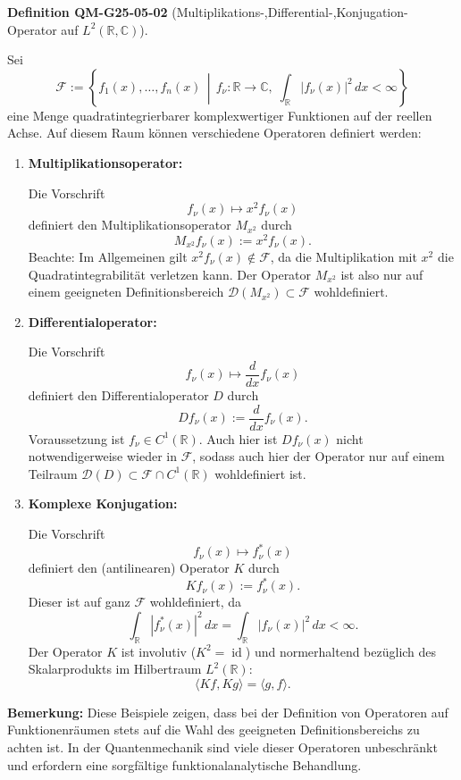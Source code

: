 \documentclass[10pt, letterpaper]{article}
\newcommand{\R}{\mathbb{R}}
\newcommand{\C}{\mathbb{C}}
\newcommand{\CustomHeading}[3]{%
  \par\medskip\noindent%
  \textbf{#1 #2} \textnormal{(#3)}.\enskip%
}
\newenvironment{DEF}[2]{\begin{unitbox}\CustomHeading{Definition}{#1}{#2}}{\end{unitbox}}
\begin{document}
\begin{DEF}{QM-G25-05-02}{Multiplikations-,Differential-,Konjugation-Operator auf $L^2(\R,\C)$}
Sei
\[
\mathcal{F} := \left\{ f_1(x), \dotsc, f_n(x) \,\middle|\, f_\nu : \mathbb{R} \to \mathbb{C}, \; \int_{\mathbb{R}} |f_\nu(x)|^2 \, dx < \infty \right\}
\]
eine Menge quadratintegrierbarer komplexwertiger Funktionen auf der reellen Achse. Auf diesem Raum können verschiedene Operatoren definiert werden:

\begin{enumerate}
  \item \textbf{Multiplikationsoperator:}

  Die Vorschrift
  \[
  f_\nu(x) \mapsto x^2 f_\nu(x)
  \]
  definiert den Multiplikationsoperator $M_{x^2}$ durch
  \[
  M_{x^2} f_\nu(x) := x^2 f_\nu(x).
  \]
  Beachte: Im Allgemeinen gilt $x^2 f_\nu(x) \notin \mathcal{F}$, da die Multiplikation mit $x^2$ die Quadratintegrabilität verletzen kann. Der Operator $M_{x^2}$ ist also nur auf einem geeigneten Definitionsbereich $\mathcal{D}(M_{x^2}) \subset \mathcal{F}$ wohldefiniert.

  \item \textbf{Differentialoperator:}

  Die Vorschrift
  \[
  f_\nu(x) \mapsto \frac{d}{dx} f_\nu(x)
  \]
  definiert den Differentialoperator $D$ durch
  \[
  D f_\nu(x) := \frac{d}{dx} f_\nu(x).
  \]
  Voraussetzung ist $f_\nu \in C^1(\mathbb{R})$. Auch hier ist $D f_\nu(x)$ nicht notwendigerweise wieder in $\mathcal{F}$, sodass auch hier der Operator nur auf einem Teilraum $\mathcal{D}(D) \subset \mathcal{F} \cap C^1(\mathbb{R})$ wohldefiniert ist.

  \item \textbf{Komplexe Konjugation:}

  Die Vorschrift
  \[
  f_\nu(x) \mapsto f_\nu^*(x)
  \]
  definiert den (antilinearen) Operator $K$ durch
  \[
  K f_\nu(x) := f_\nu^*(x).
  \]
  Dieser ist auf ganz $\mathcal{F}$ wohldefiniert, da
  \[
  \int_{\mathbb{R}} |f_\nu^*(x)|^2 \, dx = \int_{\mathbb{R}} |f_\nu(x)|^2 \, dx < \infty.
  \]
  Der Operator $K$ ist involutiv ($K^2 = \operatorname{id}$) und normerhaltend bezüglich des Skalarprodukts im Hilbertraum $L^2(\mathbb{R})$:
  \[
  \langle Kf, Kg \rangle = \langle g, f \rangle.
  \]
  
\end{enumerate}
\end{DEF}

\textbf{Bemerkung:} Diese Beispiele zeigen, dass bei der Definition von Operatoren auf Funktionenräumen stets auf die Wahl des geeigneten Definitionsbereichs zu achten ist. In der Quantenmechanik sind viele dieser Operatoren unbeschränkt und erfordern eine sorgfältige funktionalanalytische Behandlung.
\end{document}
